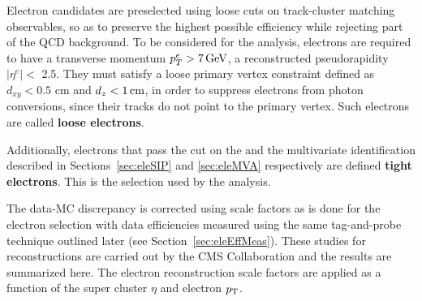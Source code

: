Electron candidates are preselected using loose cuts on track-cluster matching observables, so as to preserve the highest possible efficiency while rejecting part of the QCD background. To be considered for the analysis, electrons are required to have a
transverse momentum $p^e_T > 7 \,\text{Ge\hspace{-.08em}V}$,
a reconstructed pseudorapidity $|\eta^e| <$ 2.5.
They must satisfy a loose primary vertex
constraint defined as $d_{xy} < 0.5$ cm and $d_z < 1\,\text{cm}$,
in order to suppress electrons from photon conversions, since their tracks do not point to the primary vertex.
Such electrons are called {\bf loose electrons}.

Additionally,
electrons that pass the cut on the \SIPthreeD and the multivariate identification described in
Sections~\ref{sec:eleSIP} and \ref{sec:eleMVA} respectively
are defined {\bf tight electrons}.
This is the selection used by the analysis.

The data-MC discrepancy is corrected using scale factors as is done for the electron selection with data efficiencies measured using the same tag-and-probe technique outlined later (see Section~\ref{sec:eleEffMeas}).
These studies for reconstructions are carried out by the CMS Collaboration and the results are summarized here.
The electron reconstruction scale factors
are applied as a function of the super cluster $\eta$ and electron $p_{\mathrm{T}}$.
